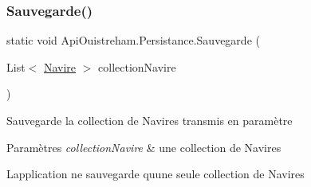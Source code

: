\subsubsection{\texorpdfstring{Sauvegarde()}{Sauvegarde()}\hspace{0.1cm}{\footnotesize\ttfamily [2/2]}}
{\footnotesize\ttfamily static void Api\+Ouistreham.\+Persistance.\+Sauvegarde (\begin{DoxyParamCaption}\item[{List$<$ \hyperlink{class_api_ouistreham_1_1_navire}{Navire} $>$}]{collection\+Navire }\end{DoxyParamCaption})\hspace{0.3cm}{\ttfamily [static]}}



Sauvegarde la collection de Navires transmis en paramètre 


\begin{DoxyParams}{Paramètres}
{\em collection\+Navire} & une collection de Navires\\
\hline
\end{DoxyParams}


L\textquotesingle{}application ne sauvegarde qu\textquotesingle{}une seule collection de Navires